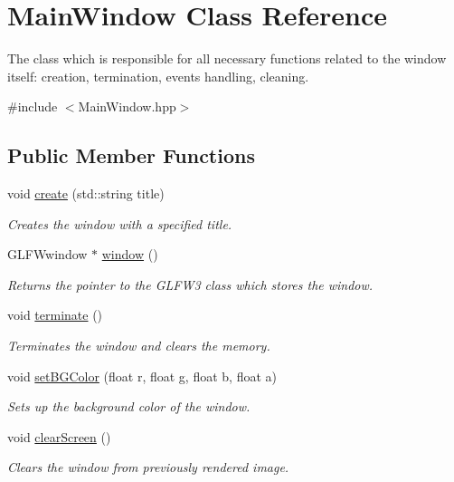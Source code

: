 \hypertarget{class_main_window}{}\section{Main\+Window Class Reference}
\label{class_main_window}


The class which is responsible for all necessary functions related to the window itself\+: creation, termination, events handling, cleaning.  




{\ttfamily \#include $<$Main\+Window.\+hpp$>$}

\subsection*{Public Member Functions}
\begin{DoxyCompactItemize}
\item 
void \hyperlink{class_main_window_a215b729f3f6e8858173e45a0beed5715}{create} (std\+::string title)
\begin{DoxyCompactList}\small\item\em Creates the window with a specified title. \end{DoxyCompactList}\item 
G\+L\+F\+Wwindow $\ast$ \hyperlink{class_main_window_a9fe6b6a6fad9fc0d04a4ebd587c663ae}{window} ()
\begin{DoxyCompactList}\small\item\em Returns the pointer to the G\+L\+F\+W3 class which stores the window. \end{DoxyCompactList}\item 
\mbox{\label{class_main_window_a24d41c1dcaa610c9789022dfb4201fa4}} 
void \hyperlink{class_main_window_a24d41c1dcaa610c9789022dfb4201fa4}{terminate} ()
\begin{DoxyCompactList}\small\item\em Terminates the window and clears the memory. \end{DoxyCompactList}\item 
void \hyperlink{class_main_window_a7880c39dad6416496f678c8f501571b6}{set\+B\+G\+Color} (float r, float g, float b, float a)
\begin{DoxyCompactList}\small\item\em Sets up the background color of the window. \end{DoxyCompactList}\item 
\mbox{\label{class_main_window_afae98f91bcccb67d79724234ca39c789}} 
void \hyperlink{class_main_window_afae98f91bcccb67d79724234ca39c789}{clear\+Screen} ()
\begin{DoxyCompactList}\small\item\em Clears the window from previously rendered image. \end{DoxyCompactList}\end{DoxyCompactItemize}
